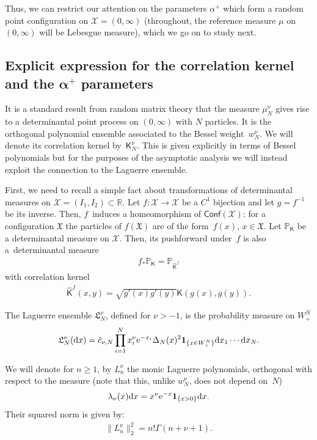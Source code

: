 Thus, we can restrict our attention on the parameters $\alpha^+$ which form a random point configuration on $\mathcal{X}=(0,\infty)$ (throughout, the reference measure $\mu$ on $(0,\infty)$ will be Lebesgue measure), which we go on to study next.

\subsection[Explicit expression for the correlation kernel and the $\alpha^+$ parameters]{Explicit expression for the correlation kernel and the $\boldsymbol{\alpha^+}$ parameters}\label{section4.2}

 It is a standard result from random matrix theory that the measure $\mu^{\nu}_N$ gives rise to a determinantal point process on $(0,\infty)$ with $N$ particles. It is the orthogonal polynomial ensemble associated to the Bessel weight~$w_N^{\nu}$. We will denote its correlation kernel by~$\mathsf{K}_N^{\nu}$. This is given explicitly in terms of Bessel polynomials but for the purposes of the asymptotic analysis we will instead exploit the connection to the Laguerre ensemble.

First, we need to recall a simple fact about transformations of determinantal measures on $\mathcal{X}=(I_1,I_2) \subset \mathbb{R}$. Let $f\colon \mathcal{X} \to \mathcal{X}$ be a $C^1$ bijection and let $g=f^{-1}$ be its inverse. Then, $f$~induces a homeomorphism of $\mathsf{Conf}(\mathcal{X})$: for a configuration $\mathfrak{X}$ the particles of $f(\mathfrak{X})$ are of the form~$f(x)$, $x \in \mathfrak{X}$. Let $\mathbb{P}_{\mathsf{K}}$ be a determinantal measure on $\mathcal{X}$. Then, its pushforward under~$f$ is also a~determinantal measure
\begin{gather*}
f_*\mathbb{P}_{\mathsf{K}}=\mathbb{P}_{\hat{\mathsf{K}}^f}
\end{gather*}
with correlation kernel
\begin{gather*}
\hat{\mathsf{K}}^f(x,y)=\sqrt{g'(x)g'(y)}\mathsf{K}(g(x),g(y)).
\end{gather*}

The Laguerre ensemble $\mathfrak{L}_N^{\nu}$, defined for $\nu>-1$, is the probability measure on $W^N_+$
\begin{gather*}
\mathfrak{L}_N^{\nu}({\rm d}x)=\tilde{c}_{\nu,N} \prod_{i=1}^{N}x_i^{\nu}{\rm e}^{-x_i}\Delta_N(x)^2 \textbf{1}_{\{x \in W^N_+\}} {\rm d}x_1\cdots {\rm d}x_N.
\end{gather*}

We will denote for $n\ge 1$, by $L_n^{\nu}$ the monic Laguerre polynomials, orthogonal with respect to the measure (note that this, unlike $w^{\nu}_N$, does not depend on~$N$)
\begin{gather*}
\lambda_\nu(x){\rm d}x=x^{\nu} {\rm e}^{-x}\textbf{1}_{\{x>0\}}{\rm d}x.
\end{gather*}
Their squared norm is given by:
\begin{gather*}
\|L_n^{\nu}\|_2^2=n! \Gamma(n+\nu+1).
\end{gather*}

